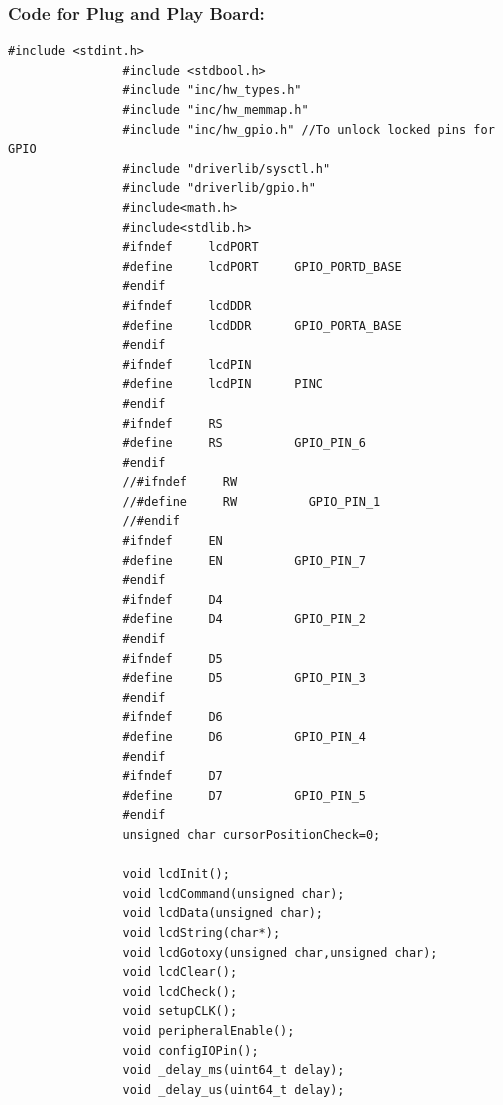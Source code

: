 \documentclass[a4paper,10pt,oneside]{article}
\begin{document}
			\subsubsection{\textbf{Code for Plug and Play Board:}}
			\begin{lstlisting}[style=CStyle]
				#include <stdint.h>
				#include <stdbool.h>
				#include "inc/hw_types.h"
				#include "inc/hw_memmap.h"
				#include "inc/hw_gpio.h" //To unlock locked pins for GPIO
				#include "driverlib/sysctl.h"
				#include "driverlib/gpio.h"
				#include<math.h>
				#include<stdlib.h>
				#ifndef     lcdPORT
				#define     lcdPORT     GPIO_PORTD_BASE
				#endif
				#ifndef     lcdDDR
				#define     lcdDDR      GPIO_PORTA_BASE
				#endif
				#ifndef     lcdPIN
				#define     lcdPIN      PINC
				#endif
				#ifndef     RS
				#define     RS          GPIO_PIN_6
				#endif
				//#ifndef     RW
				//#define     RW          GPIO_PIN_1
				//#endif
				#ifndef     EN
				#define     EN          GPIO_PIN_7
				#endif
				#ifndef     D4
				#define     D4          GPIO_PIN_2
				#endif
				#ifndef     D5
				#define     D5          GPIO_PIN_3
				#endif
				#ifndef     D6
				#define     D6          GPIO_PIN_4
				#endif
				#ifndef     D7
				#define     D7          GPIO_PIN_5
				#endif
				unsigned char cursorPositionCheck=0;
				
				void lcdInit();
				void lcdCommand(unsigned char);
				void lcdData(unsigned char);
				void lcdString(char*);
				void lcdGotoxy(unsigned char,unsigned char);
				void lcdClear();
				void lcdCheck();
				void setupCLK();
				void peripheralEnable();
				void configIOPin();
				void _delay_ms(uint64_t delay);
				void _delay_us(uint64_t delay);
				

\end{lstlisting}
\end{document}

